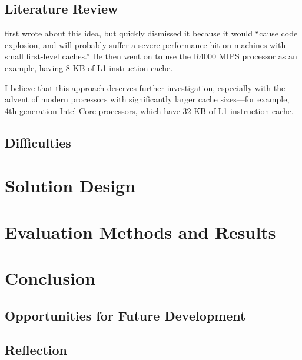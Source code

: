 	\section{Literature Review}
	\cite{stackcaching} first wrote about this idea, but quickly dismissed it because it would ``cause code explosion, and will probably suffer a severe performance hit on machines with small first-level caches.'' He then went on to use the R4000 MIPS processor as an example, having 8 KB of L1 instruction cache.
	
	I believe that this approach deserves further investigation, especially with the advent of modern processors with significantly larger cache sizes---for example, 4th generation Intel Core processors, which have 32 KB of L1 instruction cache.\citep{haswellarch}
	
	\section{Difficulties}

\chapter{Solution Design}

\chapter{Evaluation Methods and Results}

\chapter{Conclusion}
	\section{Opportunities for Future Development}
	
	\section{Reflection}

\bibliographysection

